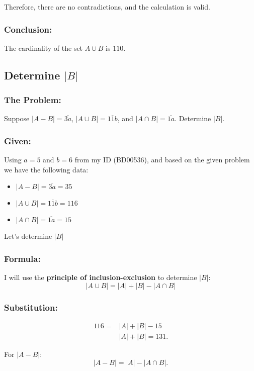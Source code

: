 \documentclass[12pt, a4paper, twoside]{report} %
\begin{document}
Therefore, there are no contradictions, and the calculation is valid.

\subsubsection*{Conclusion:}
The cardinality of the set \( A \cup B \) is $\boxed{110}$.


\subsection{Determine $| B |$}

\subsubsection*{The Problem:}
  Suppose $|A-B|=\overline{3a}$, $|A \cup B|=\overline {11b}$, and $|A \cap B|=\overline{1a}$. Determine $|B|$.

\subsubsection*{Given:}
  Using \(a = 5\) and \(b = 6\) from my ID (BD00536), and based on the given problem we have the following data:
  \begin{itemize}
    \item $\vert A - B \vert = \overline{3a} = 35$
    \item $\vert A \cup B \vert = \overline{11b} = 116$
    \item $\vert A \cap B \vert = \overline{1a} = 15$
  \end{itemize}
  Let's determine $|B|$

\subsubsection*{Formula:}
  I will use the \textbf{principle of inclusion-exclusion} to determine $|B|$:
    \[
    |A \cup B| = |A| + |B| - |A \cap B| \tag{1}
    \]

\subsubsection*{Substitution:}
  \begin{align*}
    116 = &|A| + |B| - 15 \\
    &|A| + |B| = 131. \tag{2}
  \end{align*}

  For \( |A - B| \):
  \[
  |A - B| = |A| - |A \cap B|.
  \]
\end{document}
